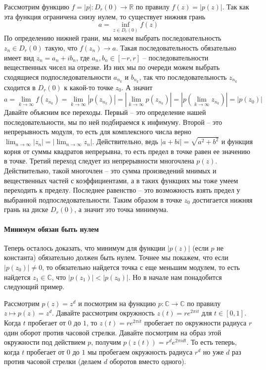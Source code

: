 Рассмотрим функцию $f = |p|\colon D_r(0)\to \mathbb R$ по правилу $f(z) = |p(z)|$.
Так как эта функция ограничена снизу нулем, то существует нижняя грань
\[
a = \inf_{z\in D_r(0)} f(z)
\]
По определению нижней грани, мы можем выбрать последовательность $z_n\in D_r(0)$ такую, что $f(z_n) \to a$.
Такая последовательность обязательно имеет вид $z_n = a_n + i b_n$, где $a_n, b_n\in [-r, r]$ -- последовательности вещественных чисел на отрезке.
Из них мы по очереди можем выбрать сходящиеся подпоследовательности $a_{n_k}$ и $b_{n_k}$, так что последовательность $z_{n_k}$ сходится в $D_r(0)$ к какой-то точке $z_0$.
А значит
\[
a = \lim_{k\to \infty} f(z_{n_k}) = \lim_{k\to \infty} |p(z_{n_k})| = \left|\lim_{k\to \infty} p(z_{n_k})\right| = \left|p\left(\lim_{k\to \infty} z_{n_k}\right)\right| = |p(z_0)|
\]
Давайте объясним все переходы.
Первый -- это определение нашей последовательности, мы по ней подбираемся к инфимуму.
Второй -- это непрерывность модуля, то есть для комплексного числа верно $\lim_{n\to \infty}|z_n| = |\lim_{n\to \infty} z_n|$.
Действительно, ведь $|a + bi| = \sqrt{a^2 + b^2}$ и функция корня от суммы квадратов непрерывна, то есть предел в точке равен ее значению в точке.
Третий переход следует из непрерывности многочлена $p(z)$.
Действительно, такой многочлен -- это сумма произведений мнимых и вещественных частей с коэффициентами, а в таких функциях мы тоже умеем переходить к пределу.
Последнее равенство -- это возможность взять предел у выбранной подпоследовательности.
Таким образом в точке $z_0$ достигается нижняя грань на диске $D_r(0)$, а значит это точка минимума.

\paragraph{Минимум обязан быть нулем}

Теперь осталось доказать, что минимум для функции $|p(z)|$ (если $p$ не константа) обязательно должен быть нулем.
Точнее мы покажем, что если $|p(z_0)|\neq 0$, то обязательно найдется точка с еще меньшим модулем, то есть найдется $z_1\in \mathbb C$, что $|p(z_1)|< |p(z_0)|$.
Но в начале нам понадобится следующий пример.

\begin{example}
[V.I.P. пример]
Рассмотрим $p(z) = z^d$ и посмотрим на функцию $p\colon \mathbb C\to \mathbb C$ по правилу $z \mapsto p(z) = z^d$.
Давайте рассмотрим окружность $z(t) = r e^{2\pi i t}$ для $t\in [0, 1]$.
Когда $t$ пробегает от $0$ до $1$, то $z(t) = r e^{2\pi i t}$ пробегает по окружности радиуса $r$ один оборот против часовой стрелки.
Давайте посмотрим на образ этой окружности под действием $p$, получим $p(z(t)) = r^d e^{2\pi i d t}$.
То есть теперь, когда $t$ пробегает от $0$ до $1$ мы пробегаем окружность радиуса $r^d$ но уже $d$ раз против часовой стрелки (делаем $d$ оборотов вместо одного).
\end{example}


